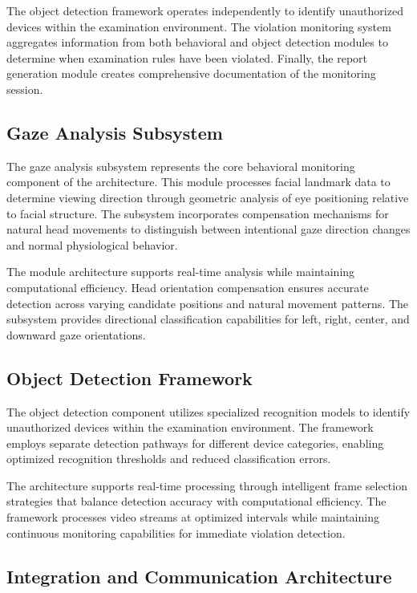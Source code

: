 \documentclass[conference]{IEEEtran}
\begin{document}
The object detection framework operates independently to identify unauthorized devices 
within the examination environment. The violation monitoring system aggregates information 
from both behavioral and object detection modules to determine when examination rules have 
been violated. Finally, the report generation module creates comprehensive documentation 
of the monitoring session.

\subsection{Gaze Analysis Subsystem}

The gaze analysis subsystem represents the core behavioral monitoring component of the 
architecture. This module processes facial landmark data to determine viewing direction 
through geometric analysis of eye positioning relative to facial structure. The subsystem 
incorporates compensation mechanisms for natural head movements to distinguish between 
intentional gaze direction changes and normal physiological behavior.

The module architecture supports real-time analysis while maintaining computational efficiency. 
Head orientation compensation ensures accurate detection across varying candidate positions 
and natural movement patterns. The subsystem provides directional classification capabilities 
for left, right, center, and downward gaze orientations.

\subsection{Object Detection Framework}

The object detection component utilizes specialized recognition models to identify unauthorized 
devices within the examination environment. The framework employs separate detection pathways 
for different device categories, enabling optimized recognition thresholds and reduced 
classification errors.

The architecture supports real-time processing through intelligent frame selection strategies 
that balance detection accuracy with computational efficiency. The framework processes video 
streams at optimized intervals while maintaining continuous monitoring capabilities for 
immediate violation detection.

\subsection{Integration and Communication Architecture}
\end{document}
